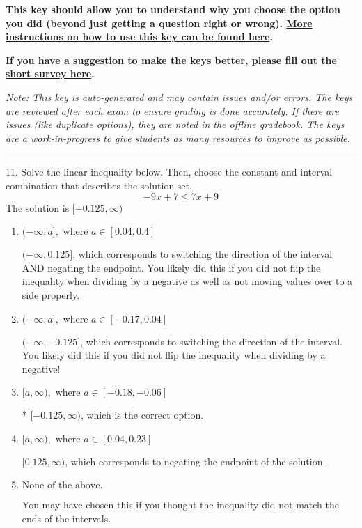 \documentclass{extbook}[14pt]
\begin{document}
\textbf{This key should allow you to understand why you choose the option you did (beyond just getting a question right or wrong). \href{https://xronos.clas.ufl.edu/mac1105spring2020/courseDescriptionAndMisc/Exams/LearningFromResults}{More instructions on how to use this key can be found here}.}

\textbf{If you have a suggestion to make the keys better, \href{https://forms.gle/CZkbZmPbC9XALEE88}{please fill out the short survey here}.}

\textit{Note: This key is auto-generated and may contain issues and/or errors. The keys are reviewed after each exam to ensure grading is done accurately. If there are issues (like duplicate options), they are noted in the offline gradebook. The keys are a work-in-progress to give students as many resources to improve as possible.}

\rule{\textwidth}{0.4pt}

11. Solve the linear inequality below. Then, choose the constant and interval combination that describes the solution set.
\[ -9x + 7 \leq 7x + 9 \] 
The solution is $ [-0.125, \infty) $ 

\begin{enumerate}[label=\Alph*.] 
\item $ (-\infty, a], \text{ where } a \in [0.04, 0.4] $ 

  $(-\infty, 0.125]$, which corresponds to switching the direction of the interval AND negating the endpoint. You likely did this if you did not flip the inequality when dividing by a negative as well as not moving values over to a side properly. 
\item $ (-\infty, a], \text{ where } a \in [-0.17, 0.04] $ 

  $(-\infty, -0.125]$, which corresponds to switching the direction of the interval. You likely did this if you did not flip the inequality when dividing by a negative! 
\item $ [a, \infty), \text{ where } a \in [-0.18, -0.06] $ 

 * $[-0.125, \infty)$, which is the correct option. 
\item $ [a, \infty), \text{ where } a \in [0.04, 0.23] $ 

  $[0.125, \infty)$, which corresponds to negating the endpoint of the solution. 
\item $ \text{None of the above}. $ 

 You may have chosen this if you thought the inequality did not match the ends of the intervals. 
\end{enumerate} 
 
\end{document}
